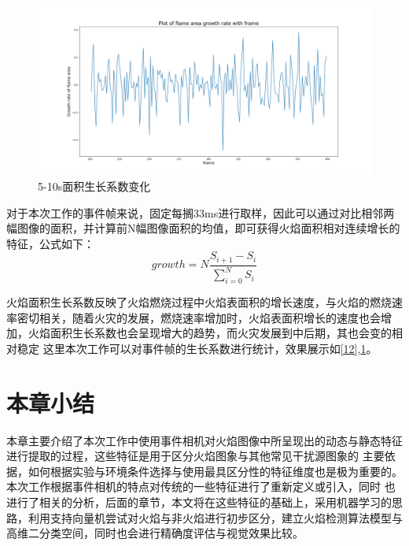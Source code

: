 \begin{figure}[ht]
        \centering
        \includegraphics[width=\textwidth]{figures/extract_area_02.png}
        \caption{5-10s面积生长系数变化}
        \label{13}
\end{figure}

对于本次工作的事件帧来说，固定每搁33ms进行取样，因此可以通过对比相邻两幅图像的面积，并计算前N幅图像面积的均值，即可获得火焰面积相对连续增长的特征，公式如下：
\begin{equation} 
    growth=N\frac{S_{i+1}-S_i}{\sum_{i=0}^{N}S_i}
\end{equation}

火焰面积生长系数反映了火焰燃烧过程中火焰表面积的增长速度，与火焰的燃烧速率密切相关，随着火灾的发展，燃烧速率增加时，火焰表面积增长的速度也会增加，火焰面积生长系数也会呈现增大的趋势，而火灾发展到中后期，其也会变的相对稳定
这里本次工作可以对事件帧的生长系数进行统计，效果展示如\ref{12},\ref{13}。

\section{本章小结}
本章主要介绍了本次工作中使用事件相机对火焰图像中所呈现出的动态与静态特征进行提取的过程，这些特征是用于区分火焰图象与其他常见干扰源图象的
主要依据，如何根据实验与环境条件选择与使用最具区分性的特征维度也是极为重要的。本次工作根据事件相机的特点对传统的一些特征进行了重新定义或引入，同时
也进行了相关的分析，后面的章节，本文将在这些特征的基础上，采用机器学习的思路，利用支持向量机尝试对火焰与非火焰进行初步区分，建立火焰检测算法模型与高维二分类空间，同时也会进行精确度评估与视觉效果比较。